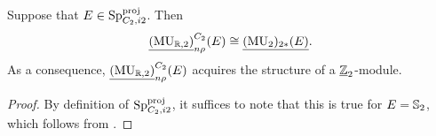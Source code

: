 



%

\begin{lem} \label{lem:MUR-uZ-mod}
  Suppose that $E \in \operatorname{\mathrm{Sp}}_{C_2, i2} ^{\mathrm{proj}}$. Then 
  \[\underline{(\operatorname{\mathrm{MU}}_{\mathbb{R},2})}_{n\rho} ^{C_2} (E) \cong \underline{(\operatorname{\mathrm{MU}}_2)_{2*} (E)}.\]
  As a consequence, $\underline{(\operatorname{\mathrm{MU}}_{\mathbb{R},2})}_{n\rho} ^{C_2} (E)$ acquires the structure of a $\underline{\mathbb{Z}}_{2}$-module.
\end{lem}

\begin{proof}
  By definition of $\operatorname{\mathrm{Sp}}_{C_2, i2} ^{\mathrm{proj}}$, it suffices to note that this is true for $E = \operatorname{\mathbb{S}}_2$, which follows from \cite[Theorem 2.28]{HuKriz}.
\end{proof}

